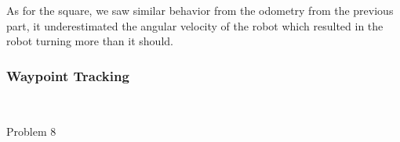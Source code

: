 \documentclass[answers]{exam}
\begin{document}
\begin{questions}
    As for the square, we saw similar behavior from the odometry from the previous
    part, it underestimated the angular velocity of the robot which resulted in the
    robot turning more than it should. \subsubsection*{Waypoint Tracking}
    \begin{figure}[H]
        \centering
        \qquad
        \\
    \end{figure}
    \question Problem 8
\end{questions}
\end{document}
